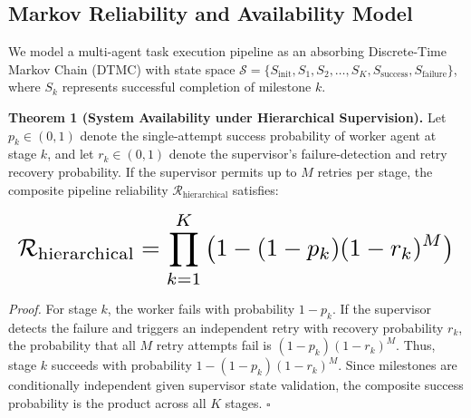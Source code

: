 \documentclass[11pt,a4paper]{article}
\begin{document}
\subsection{Markov Reliability and Availability Model}


We model a multi-agent task execution pipeline as an absorbing Discrete-Time Markov Chain (DTMC) with state space $\mathcal{S} = \{S_{\text{init}}, S_1, S_2, \ldots, S_K, S_{\text{success}}, S_{\text{failure}}\}$, where $S_k$ represents successful completion of milestone $k$.

\textbf{Theorem 1 (System Availability under Hierarchical Supervision).} Let $p_k \in (0, 1)$ denote the single-attempt success probability of worker agent at stage $k$, and let $r_k \in (0, 1)$ denote the supervisor's failure-detection and retry recovery probability. If the supervisor permits up to $M$ retries per stage, the composite pipeline reliability $\mathcal{R}_{\text{hierarchical}}$ satisfies:






















\begin{equation}
\resizebox{\columnwidth}{!}{$\displaystyle
\begin{aligned}
\mathcal{R}_{\text{hierarchical}} = \prod_{k=1}^K \left( 1 - (1 - p_k)(1 - r_k)^M \right)
\end{aligned}
$}
\end{equation}






















\textit{Proof.} For stage $k$, the worker fails with probability $1 - p_k$. If the supervisor detects the failure and triggers an independent retry with recovery probability $r_k$, the probability that all $M$ retry attempts fail is $(1 - p_k)(1 - r_k)^M$. Thus, stage $k$ succeeds with probability $1 - (1 - p_k)(1 - r_k)^M$. Since milestones are conditionally independent given supervisor state validation, the composite success probability is the product across all $K$ stages. $\square$
\end{document}
